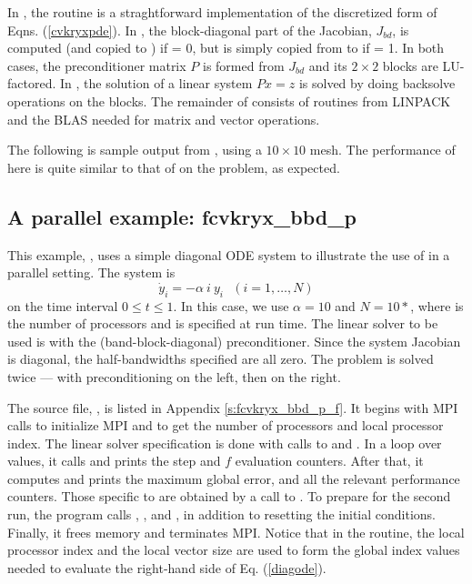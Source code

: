 In , the  routine is a straghtforward implementation
of the discretized form of Eqns. (\ref{cvkryxpde}).  In , the
block-diagonal part of the Jacobian, $J_{bd}$, is computed (and copied to
) if  = 0, but is simply copied from  to  if
 = 1.  In both cases, the preconditioner matrix $P$ is formed from 
$J_{bd}$ and its $2 \times 2$ blocks are LU-factored.  In ,
the solution of a linear system $Px = z$ is solved by doing backsolve
operations on the blocks.  The remainder of  consists of
routines from LINPACK and the BLAS needed for matrix and vector operations.

The following is sample output from , using a $10 \times 10$ mesh.
The performance of {\fcvode} here is quite similar to that of {\cvode} on
the  problem, as expected.



\subsection{A parallel example: fcvkryx\_bbd\_p}\label{ss:fcvkryx_bbd_p}

This example, , uses a simple diagonal ODE system to illustrate
the use of {\fcvode} in a parallel setting.  The system is
\begin{equation} \label{diagode}
\dot{y}_i = - \alpha ~i~ y_i ~~~ (i = 1,\ldots, N)
\end{equation}
on the time interval $0 \leq t \leq 1$.  In this case, we use $\alpha = 10$
and $N = 10*$, where  is the number of processors
and is specified at run time.  The linear solver to be used is
{\spgmr} with the {\cvbbdpre} (band-block-diagonal) preconditioner.
Since the system Jacobian is diagonal, the half-bandwidths specified
are all zero.  The problem is solved twice --- with preconditioning on
the left, then on the right.

The source file, , is listed in Appendix \ref{s:fcvkryx_bbd_p_f}.
It begins with MPI calls to initialize MPI and to get the number of processors
and local processor index.  The linear solver specification is done with
calls to  and .  In a loop over 
values, it calls  and prints the step and $f$ evaluation counters.
After that, it computes and prints the maximum global error, and all the
relevant performance counters.  Those specific to {\cvbbdpre} are obtained
by a call to .  To prepare for the second run, the program
calls , , and , in addition
to resetting the initial conditions.  Finally, it frees memory and terminates MPI.
Notice that in the  routine, the local processor index 
and the local vector size  are used to form the global index
values needed to evaluate the right-hand side of Eq. (\ref{diagode}).


